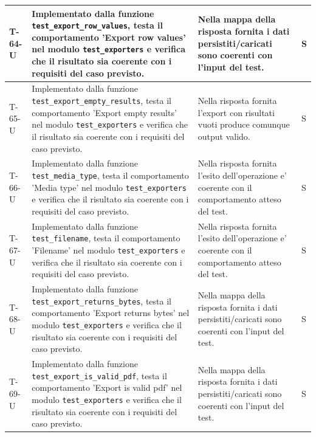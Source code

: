 \documentclass[a4paper,12pt]{article}
\begin{document}
{{\begin{longtable}{|>{\RaggedRight\arraybackslash}p{1.55cm}|>{\RaggedRight\arraybackslash}p{8.0cm}|>{\RaggedRight\arraybackslash}p{4.6cm}|>{\RaggedRight\arraybackslash}p{1.2cm}|}
        \hline
        T-64-U & Implementato dalla funzione \texttt{test\_\allowbreak export\_\allowbreak row\_\allowbreak values}, testa il comportamento 'Export row values' nel modulo \texttt{test\_\allowbreak exporters} e verifica che il risultato sia coerente con i requisiti del caso previsto. & Nella mappa della risposta fornita i dati persistiti/caricati sono coerenti con l'input del test. & S \\
        \hline
        T-65-U & Implementato dalla funzione \texttt{test\_\allowbreak export\_\allowbreak empty\_\allowbreak results}, testa il comportamento 'Export empty results' nel modulo \texttt{test\_\allowbreak exporters} e verifica che il risultato sia coerente con i requisiti del caso previsto. & Nella risposta fornita l'export con risultati vuoti produce comunque output valido. & S \\
        \hline
        T-66-U & Implementato dalla funzione \texttt{test\_\allowbreak media\_\allowbreak type}, testa il comportamento 'Media type' nel modulo \texttt{test\_\allowbreak exporters} e verifica che il risultato sia coerente con i requisiti del caso previsto. & Nella risposta fornita l'esito dell'operazione e' coerente con il comportamento atteso del test. & S \\
        \hline
        T-67-U & Implementato dalla funzione \texttt{test\_\allowbreak filename}, testa il comportamento 'Filename' nel modulo \texttt{test\_\allowbreak exporters} e verifica che il risultato sia coerente con i requisiti del caso previsto. & Nella risposta fornita l'esito dell'operazione e' coerente con il comportamento atteso del test. & S \\
        \hline
        T-68-U & Implementato dalla funzione \texttt{test\_\allowbreak export\_\allowbreak returns\_\allowbreak bytes}, testa il comportamento 'Export returns bytes' nel modulo \texttt{test\_\allowbreak exporters} e verifica che il risultato sia coerente con i requisiti del caso previsto. & Nella mappa della risposta fornita i dati persistiti/caricati sono coerenti con l'input del test. & S \\
        \hline
        T-69-U & Implementato dalla funzione \texttt{test\_\allowbreak export\_\allowbreak is\_\allowbreak valid\_\allowbreak pdf}, testa il comportamento 'Export is valid pdf' nel modulo \texttt{test\_\allowbreak exporters} e verifica che il risultato sia coerente con i requisiti del caso previsto. & Nella mappa della risposta fornita i dati persistiti/caricati sono coerenti con l'input del test. & S \\

\end{longtable}}}
\end{document}
